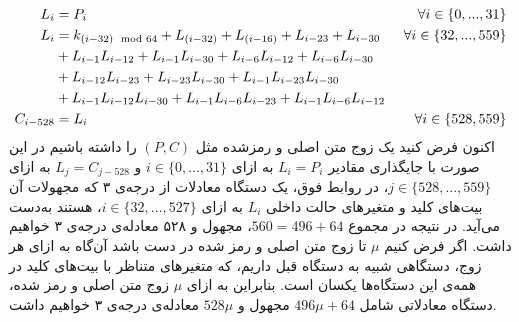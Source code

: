 {\small \begin{align*}
L_{i} &= P_{i}  \  &\forall i\in \{0,...,31\}\\
L_{i} &= k_{(i - 32)\mod 64} + L_{(i - 32)} + L_{(i - 16)} + L_{i - 23} + L_{i - 30} \ &\forall i\in\{32,...,559\}\\
\ & + L_{i -1}L_{i - 12} + L_{i-1}L_{i - 30} + L_{i - 6}L_{i - 12} + L_{i - 6}L_{i - 30} \ & \\
 \ &+ L_{i - 12}L_{i - 23} + L_{i - 23} L_{i - 30} + L_{i - 1} L_{i - 23} L_{i - 30} \ & \ \\
 \ & +L_{i -1}L_{i - 12}L_{i - 30} + L_{i - 1} L_{i - 6} L_{i - 23} + L_{i -1}L_{i - 6} L_{i - 12} \ &  \ \\
C_{i - 528} &= L_{i} \ &\forall i\in \{528, 559\}
\end{align*}}
اکنون فرض کنید یک زوج متن اصلی و رمزشد‌ه مثل 
$(P,C)$
را داشته باشیم در این صورت با جایگذاری مقادیر 
$L_{i} = P_{i}$
به ازای 
$i\in \{0,...,31\}$
و
$L_{j} = C_{j - 528}$
به ازای 
$j\in\{528,...,559\}$، 
 در روابط فوق،  یک دستگاه معادلات از درجه‌ی ۳ که مجهولات آن بیت‌های کلید و متغیرهای حالت داخلی 
$L_{i}$
به ازای 
$i\in \{32,...,527\}$، 
 هستند به‌دست می‌آید. در نتیجه در مجموع
$560 = 496 + 64$، 
  مجهول و ۵۲۸ معادله‌ی درجه‌ی ۳ خواهیم داشت. اگر فرض کنیم 
$\mu$
تا زوج متن اصلی و رمز شده در دست باشد آن‌گاه به ازای هر زوج، دستگاهی شبیه به دستگاه قبل داریم، که متغیرهای متناظر با بیت‌های کلید در همه‌ی این دستگاه‌ها یکسان است. بنابراین به ازای 
$\mu$
 زوج متن اصلی و رمز شده، دستگاه معادلاتی شامل 
 $496\mu + 64$
 مجهول و 
 $528\mu$
 معادله‌ی درجه‌ی ۳ خواهیم داشت. 
 
